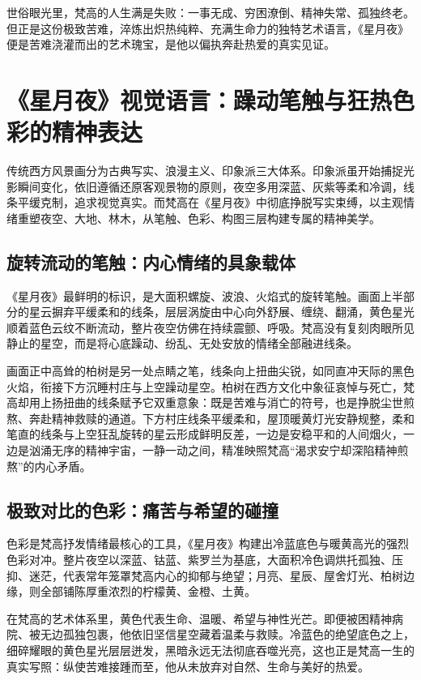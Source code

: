 \documentclass[12pt,a4paper]{article}
\begin{document}
世俗眼光里，梵高的人生满是失败：一事无成、穷困潦倒、精神失常、孤独终老。但正是这份极致苦难，淬炼出炽热纯粹、充满生命力的独特艺术语言，《星月夜》便是苦难浇灌而出的艺术瑰宝，是他以偏执奔赴热爱的真实见证。

\section{《星月夜》视觉语言：躁动笔触与狂热色彩的精神表达}
传统西方风景画分为古典写实、浪漫主义、印象派三大体系。印象派虽开始捕捉光影瞬间变化，依旧遵循还原客观景物的原则，夜空多用深蓝、灰紫等柔和冷调，线条平缓克制，追求视觉真实。而梵高在《星月夜》中彻底挣脱写实束缚，以主观情绪重塑夜空、大地、林木，从笔触、色彩、构图三层构建专属的精神美学。

\subsection{旋转流动的笔触：内心情绪的具象载体}
《星月夜》最鲜明的标识，是大面积螺旋、波浪、火焰式的旋转笔触。画面上半部分的星云摒弃平缓柔和的线条，层层涡旋由中心向外舒展、缠绕、翻涌，黄色星光顺着蓝色云纹不断流动，整片夜空仿佛在持续震颤、呼吸。梵高没有复刻肉眼所见静止的星空，而是将心底躁动、纷乱、无处安放的情绪全部融进线条。

画面正中高耸的柏树是另一处点睛之笔，线条向上扭曲尖锐，如同直冲天际的黑色火焰，衔接下方沉睡村庄与上空躁动星空。柏树在西方文化中象征哀悼与死亡，梵高却用上扬扭曲的线条赋予它双重意象：既是苦难与消亡的符号，也是挣脱尘世煎熬、奔赴精神救赎的通道。下方村庄线条平缓柔和，屋顶暖黄灯光安静规整，柔和笔直的线条与上空狂乱旋转的星云形成鲜明反差，一边是安稳平和的人间烟火，一边是汹涌无序的精神宇宙，一静一动之间，精准映照梵高“渴求安宁却深陷精神煎熬”的内心矛盾。

\subsection{极致对比的色彩：痛苦与希望的碰撞}
色彩是梵高抒发情绪最核心的工具，《星月夜》构建出冷蓝底色与暖黄高光的强烈色彩对冲。整片夜空以深蓝、钴蓝、紫罗兰为基底，大面积冷色调烘托孤独、压抑、迷茫，代表常年笼罩梵高内心的抑郁与绝望；月亮、星辰、屋舍灯光、柏树边缘，则全部铺陈厚重浓烈的柠檬黄、金橙、土黄。

在梵高的艺术体系里，黄色代表生命、温暖、希望与神性光芒。即便被困精神病院、被无边孤独包裹，他依旧坚信星空藏着温柔与救赎。冷蓝色的绝望底色之上，细碎耀眼的黄色星光层层迸发，黑暗永远无法彻底吞噬光亮，这也正是梵高一生的真实写照：纵使苦难接踵而至，他从未放弃对自然、生命与美好的热爱。
\end{document}

